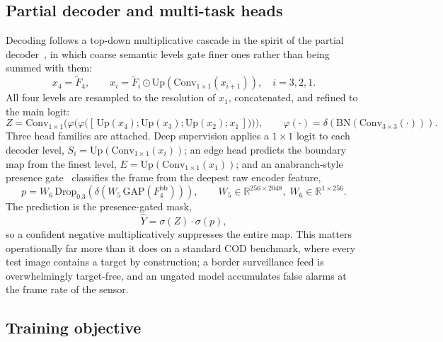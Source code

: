 \documentclass[3p,times,procedia]{elsarticle}
\newcommand{\eltmul}{\odot}
\begin{document}
\subsection{Partial decoder and multi-task heads}

Decoding follows a top-down multiplicative cascade in the spirit of the partial decoder~\cite{cpd}, in which coarse semantic levels gate finer ones rather than being summed with them:
\begin{equation}
x_4 = \tilde{F}_4,
\qquad
x_i = \tilde{F}_i \eltmul \mathrm{Up}\!\left(\mathrm{Conv}_{1\times1}(x_{i+1})\right), \quad i = 3,2,1 .
\end{equation}
All four levels are resampled to the resolution of $x_1$, concatenated, and refined to the main logit:
\begin{equation}
Z = \mathrm{Conv}_{1\times1}\Big(\varphi\big(\varphi\big([\,\mathrm{Up}(x_4);\mathrm{Up}(x_3);\mathrm{Up}(x_2);x_1\,]\big)\big)\Big),
\qquad
\varphi(\cdot) = \delta(\mathrm{BN}(\mathrm{Conv}_{3\times3}(\cdot))).
\end{equation}
Three head families are attached. Deep supervision applies a $1\times1$ logit to each decoder level, $S_i = \mathrm{Up}(\mathrm{Conv}_{1\times1}(x_i))$; an edge head predicts the boundary map from the finest level, $E = \mathrm{Up}(\mathrm{Conv}_{1\times1}(x_1))$; and an anabranch-style presence gate~\cite{camo} classifies the frame from the deepest raw encoder feature,
\begin{equation}
p = W_6\,\mathrm{Drop}_{0.3}\!\left(\delta\!\left(W_5\,\mathrm{GAP}(F_4^{\mathrm{bb}})\right)\right),
\qquad
W_5 \in \mathbb{R}^{256 \times 2048},\; W_6 \in \mathbb{R}^{1 \times 256}.
\end{equation}
The prediction is the presence-gated mask,
\begin{equation}
\hat{Y} = \sigma(Z) \cdot \sigma(p),
\label{eq:gated}
\end{equation}
so a confident negative multiplicatively suppresses the entire map. This matters operationally far more than it does on a standard COD benchmark, where every test image contains a target by construction; a border surveillance feed is overwhelmingly target-free, and an ungated model accumulates false alarms at the frame rate of the sensor.

\subsection{Training objective}
\end{document}
